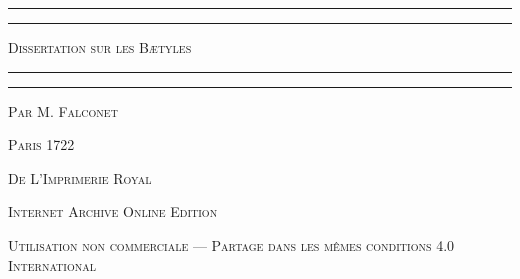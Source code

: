 \documentclass[a4paper, 11pt, oneside, polutonikogreek, french, landscape]{article}
\begin{document}
\bfseries
\renewcommand\thefootnote{\bfseries{\arabic{footnote}}}
\let\oldfootnote\footnote
    \renewcommand{\footnote}[1]{\oldfootnote{\bfseries#1}}
    
\begin{titlepage} %
	\centering %

	
	\rule{\textwidth}{1.6pt}\vspace*{-\baselineskip}\vspace*{2pt} %
	\rule{\textwidth}{0.4pt} %
	
	\vspace{1\baselineskip} %
	
	{\scshape\Huge Dissertation sur les Bætyles}
	
	\vspace{1\baselineskip} %

	\rule{\textwidth}{0.4pt}\vspace*{-\baselineskip}\vspace{3.2pt} %
	\rule{\textwidth}{1.6pt} %
	
	\vspace{1\baselineskip} %
	
	
	{\scshape \Large Par M. Falconet} %
	
	\vspace*{1\baselineskip} %
	
        {\scshape\scriptsize } %
    
        \vspace*{\fill}

	\vspace{1\baselineskip}

	{\small\scshape Paris 1722}
	
	{\small\scshape{De L'Imprimerie Royal}}
	
	\vspace{0.5\baselineskip} %

        \scshape Internet Archive Online Edition  %
	
	{\scshape\small Utilisation non commerciale --- Partage dans les mêmes conditions 4.0 International} %
\end{titlepage}
\setlength{\parskip}{1mm plus1mm minus1mm}
\clearpage
\large
\end{document}
